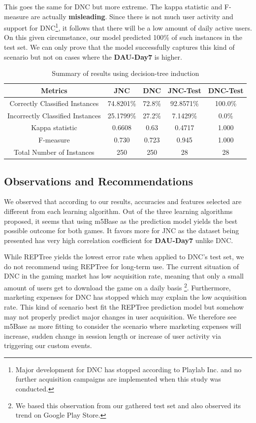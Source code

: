 This goes the same for DNC but more extreme. The kappa statistic and F-measure are actually \textbf{misleading}. Since there is not much user activity and support for DNC\footnote{Major development for DNC has stopped according to Playlab Inc. and no further acquisition campaigns are implemented when this study was conducted.}, it follows that there will be a low amount of daily active users. On this given circumstance, our model predicted 100\% of such instances in the test set. We can only prove that the model successfully captures this kind of scenario but not on cases where the \textbf{DAU-Day7} is higher.

\begin{table}
\centering
\caption{Summary of results using decision-tree induction}
\label{table:j48_summary_results}
\begin{tabular}{|c|c|c|c|c|}
\hline 
Metrics & JNC & DNC & JNC-Test & DNC-Test \\ 
\hline 
Correctly Classified Instances  & 74.8201\% & 72.8\%  & 92.8571\%  & 100.0\%\\
Incorrectly Classified Instances & 25.1799\% & 27.2\% & 7.1429\% & 0.0\%\\
Kappa statistic & 0.6608 & 0.63 & 0.4717 & 1.000 \\
F-measure & 0.730 & 0.723 & 0.945 & 1.000 \\
Total Number of Instances & 250 & 250 & 28 & 28
\\
\hline 
\end{tabular}
\end{table}

\subsection{Observations and Recommendations}
We observed that according to our results, accuracies and features selected are different from each learning algorithm. Out of the three learning algorithms proposed, it seems that using m5Base as the prediction model yields the best possible outcome for both games. It favors more for JNC as the dataset being presented has very high correlation coefficient for \textbf{DAU-Day7} unlike DNC.

While REPTree yields the lowest error rate when applied to DNC's test set, we do not recommend using REPTree for long-term use. The current situation of DNC in the gaming market has low acquisition rate, meaning that only a small amount of users get to download the game on a daily basis \footnote{We based this observation from our gathered test set and also observed its trend on Google Play Store.}. Furthermore, marketing expenses for DNC has stopped which may explain the low acquisition rate. This kind of scenario best fit the REPTree prediction model but somehow may not properly predict major changes in user acquisition. We therefore see m5Base as more fitting to consider the scenario where marketing expenses will increase, sudden change in session length or increase of user activity via triggering our custom events.

